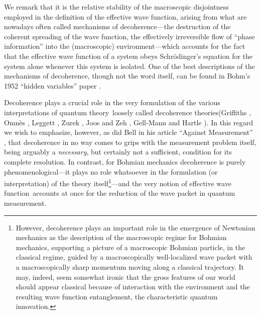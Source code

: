 \documentclass[12pt]{article}
\newcommand{\Sc}{Schr\"{o}dinger}
\newcommand{\qt}{quantum theory}
\newcommand{\ewf}{effective wave function}
\begin{document}
We remark that it is the relative stability of the macroscopic
disjointness employed in the definition of the \ewf, arising {}from
what are nowadays often called mechanisms of decoherence---the
destruction of the coherent spreading of the wave function, the
effectively irreversible flow of ``phase information'' into the
(macroscopic) environment---which accounts for the fact that the
\ewf{} of a system obeys \Sc's equation for the system alone whenever
this system is isolated.  One of the best descriptions of the
mechanisms of decoherence, though not the word itself, can be found in
Bohm's 1952 ``hidden variables'' paper \cite{Boh52}.

Decoherence plays a crucial role in the very formulation of the
various interpretations of \qt\ loosely called decoherence
theories(Griffiths \cite{Gri84}, Omn\`es \cite{Omn88}, Leggett
\cite{Leg80}, Zurek \cite{Zur82}, Joos and Zeh \cite{JZ85}, Gell-Mann
and Hartle \cite{GMH90}).  In this regard we wish to emphasize,
however, as did Bell in his article ``Against Measurement''
\cite{Bel90}, that decoherence in no way comes to grips with the
measurement problem itself, being arguably a {\it necessary}, but
certainly not a sufficient, condition for its complete resolution.  In
contrast, for Bohmian mechanics decoherence is purely
phenomenological---it plays no role whatsoever in the formulation (or
interpretation) of the theory itself\footnote{However, decoherence
   plays an important role in the emergence of Newtonian mechanics as
   the description of the macroscopic regime for Bohmian mechanics,
   supporting a picture of a macroscopic Bohmian particle, in the
   classical regime, guided by a macroscopically well-localized wave
   packet with a macroscopically sharp momentum moving along a
   classical trajectory.  It may, indeed, seem somewhat ironic that the
   gross features of our world should appear classical because of
   interaction with the environment and the resulting wave function
   entanglement, the characteristic quantum innovation.}---and the very
notion of \ewf\ accounts at once for the reduction of the wave packet
in quantum measurement.
\end{document}
